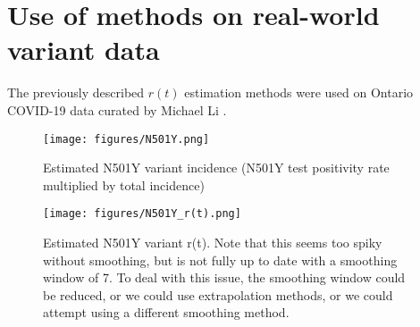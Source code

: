 \documentclass{article}
\newcommand{\nr}{r}
\begin{document}
\section{Use of methods on real-world variant data}
The previously described $\nr(t)$ estimation methods were used on Ontario COVID-19 data curated by Michael Li \cite{mli}. 

\clearpage
\begin{figure}[h!]
    \centering
    \texttt{[image: figures/N501Y.png]}
    \caption{Estimated N501Y variant incidence (N501Y test positivity rate multiplied by total incidence)}
    \label{fig:my_label}
\end{figure}

\clearpage
\begin{figure}[h!]
    \centering
    \texttt{[image: figures/N501Y\_r(t).png]}
    \caption{Estimated N501Y variant r(t). Note that this seems too spiky without smoothing, but is not fully up to date with a smoothing window of 7. To deal with this issue, the smoothing window could be reduced, or we could use extrapolation methods, or we could attempt using a different smoothing method.}
    \label{fig:my_label}
\end{figure}
\end{document}
